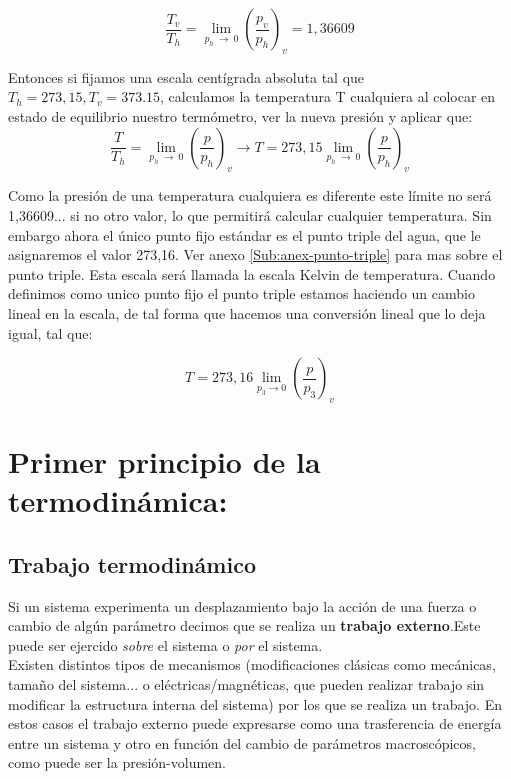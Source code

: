 \documentclass[12pt,a4paper]{article}
\newcommand{\parentesis}[1]{\left( #1 \right)}
\begin{document}
$$\dfrac{T_v}{T_h} =  \lim_{p_h \ \longrightarrow \ 0} \left( \dfrac{p_v}{p_h} \right)_v = 1,36609 $$

Entonces si fijamos una escala centígrada absoluta tal que $T_h = 273,15, T_v=373.15$, calculamos la temperatura T cualquiera al colocar en estado de equilibrio nuestro termómetro, ver la nueva presión y aplicar que:
$$ \dfrac{T}{T_h} = \lim_{p_h \ \longrightarrow \ 0} \left( \dfrac{p}{p_h} \right)_v \longrightarrow T = 273,15 \lim_{p_h \ \longrightarrow \ 0} \left( \dfrac{p}{p_h} \right)_v $$

Como la presión de una temperatura cualquiera es diferente este límite no será 1,36609... si no otro valor, lo que permitirá calcular cualquier temperatura. Sin embargo ahora el único punto fijo estándar es el punto triple del agua, que le asignaremos el valor 273,16. Ver anexo \ref{Sub:anex-punto-triple} para mas sobre el punto triple. Esta escala será llamada la escala Kelvin de temperatura. Cuando definimos como unico punto fijo el punto triple estamos haciendo un cambio lineal en la escala, de tal forma que hacemos una conversión lineal que lo deja igual, tal que:

\begin{equation}
T = 273,16 \lim_{p_3 \rightarrow 0} \parentesis{\dfrac{p}{p_3}}_v
\end{equation}

\newpage

\section{Primer principio de la termodinámica:}

\subsection{Trabajo termodinámico}

Si un sistema experimenta un desplazamiento bajo la acción de una fuerza o cambio de algún parámetro decimos que se realiza un \textbf{trabajo externo}.Este puede ser ejercido \textit{sobre} el sistema o \textit{por} el sistema. \\

Existen distintos tipos de mecanismos (modificaciones clásicas como mecánicas, tamaño del sistema... o eléctricas/magnéticas, que pueden realizar trabajo sin modificar la estructura interna del sistema) por los que se realiza un trabajo. En estos casos el trabajo externo puede expresarse como una trasferencia de energía entre un sistema y otro en función del cambio de parámetros macroscópicos, como puede ser la presión-volumen. \\
\end{document}
